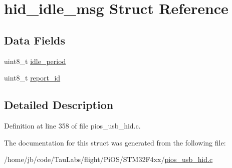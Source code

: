 \hypertarget{structhid__idle__msg}{\section{hid\-\_\-idle\-\_\-msg \-Struct \-Reference}
\label{structhid__idle__msg}
}
\subsection*{\-Data \-Fields}
\begin{DoxyCompactItemize}
\item 
uint8\-\_\-t \hyperlink{group___p_i_o_s___u_s_b___h_i_d_ga6f939e967dc4622730a02a7d467edf7a}{idle\-\_\-period}
\item 
uint8\-\_\-t \hyperlink{group___p_i_o_s___u_s_b___h_i_d_gae36ecdd57567fb6f4ee28b3130b3c8ee}{report\-\_\-id}
\end{DoxyCompactItemize}


\subsection{\-Detailed \-Description}


\-Definition at line 358 of file pios\-\_\-usb\-\_\-hid.\-c.



\-The documentation for this struct was generated from the following file\-:\begin{DoxyCompactItemize}
\item 
/home/jb/code/\-Tau\-Labs/flight/\-Pi\-O\-S/\-S\-T\-M32\-F4xx/\hyperlink{_s_t_m32_f4xx_2pios__usb__hid_8c}{pios\-\_\-usb\-\_\-hid.\-c}\end{DoxyCompactItemize}
